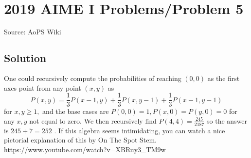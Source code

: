 \documentclass[12pt]{article}
\begin{document}
\section*{{2019 AIME I Problems/Problem 5}}
Source: AoPS Wiki

\subsection*{Solution}
One could recursively compute the probabilities of reaching $(0,0)$ as the first axes point from any point $(x,y)$ as \[P(x,y) = \frac{1}{3} P(x-1,y) + \frac{1}{3} P(x,y-1) + \frac{1}{3} P(x-1,y-1)\] for $x,y \geq 1,$ and the base cases are $P(0,0) = 1, P(x,0) = P(y,0) = 0$ for any $x,y$ not equal to zero.
We then recursively find $P(4,4) = \frac{245}{2187}$ so the answer is $245 + 7 = \boxed{252}$ . If this algebra seems intimidating, you can watch a nice pictorial explanation of this by On The Spot Stem. https://www.youtube.com/watch?v=XBRuy3_TM9w
\end{document}
